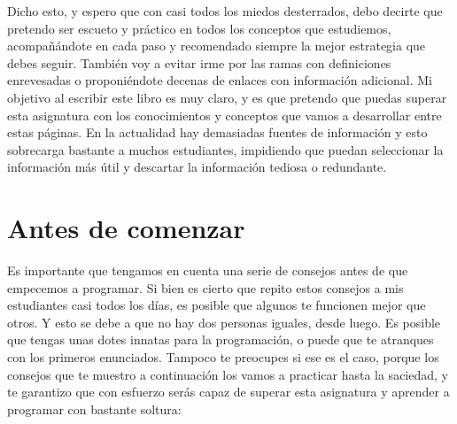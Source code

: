 Dicho esto, y espero que con casi todos los miedos desterrados, debo decirte que pretendo ser escueto y práctico en todos los 
conceptos que estudiemos, acompañándote en cada paso y recomendado siempre la mejor estrategia que debes seguir. También voy a evitar
irme por las ramas con definiciones enrevesadas o proponiéndote decenas de enlaces con información adicional. Mi objetivo al escribir
este libro es muy claro, y es que pretendo que puedas superar esta asignatura con los conocimientos y conceptos que vamos a desarrollar
entre estas páginas. En la actualidad hay demasiadas fuentes de información y esto sobrecarga bastante a muchos estudiantes, impidiendo 
que puedan seleccionar la información más útil y descartar la información tediosa o redundante. 

\section{Antes de comenzar}

Es importante que tengamos en cuenta una serie de consejos antes de que empecemos a programar. Si bien es cierto que repito estos consejos
a mis estudiantes casi todos los días, es posible que algunos te funcionen mejor que otros. Y esto se debe a que no hay dos personas
iguales, desde luego. Es posible que tengas unas dotes innatas para la programación, o puede que te atranques con los primeros enunciados.
Tampoco te preocupes si ese es el caso, porque los consejos que te muestro a continuación los vamos a practicar hasta la saciedad, y
te garantizo que con esfuerzo serás capaz de superar esta asignatura y aprender a programar con bastante soltura:

